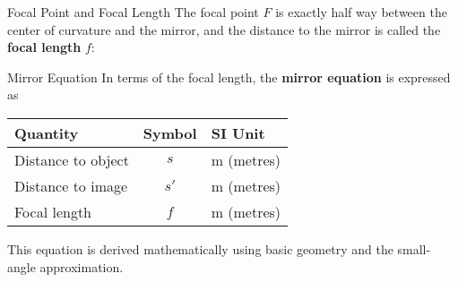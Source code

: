 \documentclass[compress,aspectratio=169]{beamer}
\newcommand{\eq}[2]{\vspace{#1}{\LARGE\begin{displaymath}#2\end{displaymath}}}
\begin{document}
\begin{frame}{Focal Point and Focal Length}
  The focal point $F$ is exactly half way between the center of curvature and
  the mirror, and the distance to the mirror is called the \textbf{focal length}
  $f$:

  \eq{-.2in}{
    \boxed{f=\frac12 r}
  }
  \begin{center}
  \end{center}
  
\end{frame}


\begin{frame}{Mirror Equation}
  In terms of the focal length, the \textbf{mirror equation} is expressed as

  \eq{-.2in}{
    \boxed{\frac{1}{s}+\frac{1}{s'}=\frac{1}{f}}
  }
  \begin{center}
    \begin{tabular}{l|c|l}
      \rowcolor{pink}
      \textbf{Quantity} & \textbf{Symbol} & \textbf{SI Unit} \\ \hline
      Distance to object & $s$  & \si{\metre} (metres)\\
      Distance to image  & $s'$ & \si{\metre} (metres) \\
      Focal length       & $f$  & \si{\metre} (metres)
    \end{tabular}
  \end{center}
  This equation is derived mathematically using basic geometry and the
  small-angle approximation.
\end{frame}
\end{document}
